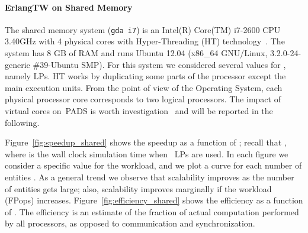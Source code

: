 \documentclass{sigplanconf}
\begin{document}
\begin{figure*}[ht]
\centering {}
\caption{Speedup on the shared memory architecture as a function of
  the number of~\acp{LP} (higher is better)}\label{fig:speedup_shared}
\end{figure*}

\begin{figure*}[ht]
\centering {}
\caption{Efficiency on the shared memory architecture as a function of
  the number of~\acp{LP} (higher is better)}\label{fig:efficiency_shared}
\end{figure*}

\begin{figure*}[h!t]
\centering {}
\caption{Total number of rollbacks on the shared memory architecture
  as a function of the number of LPs (lower is
  better)}\label{fig:rollbacks_shared}
\end{figure*}

\paragraph{ErlangTW on Shared Memory}
The shared memory system (\verb+gda i7+) is an Intel(R) Core(TM)
i7-2600 CPU \@ 3.40GHz with 4 physical cores with Hyper-Threading (HT)
technology~\cite{HT}. The system has 8 GB of RAM and runs Ubuntu 12.04
(x86\_64 GNU/Linux, 3.2.0-24-generic \#39-Ubuntu SMP). For this system
we considered several values for , namely 
\acp{LP}. HT works by duplicating some parts of the processor except
the main execution units. From the point of view of the Operating
System, each physical processor core corresponds to two logical
processors. The impact of virtual cores on~\ac{PADS} is worth
investigation~\cite{gda-dsrt-2006,gda12} and will be reported in the
following.

Figure~\ref{fig:speedup_shared} shows the speedup  as a function
of ; recall that , where  is the wall clock
simulation time when ~\acp{LP} are used.  In each figure we
consider a specific value for the workload, and we plot a curve for
each number of entities . As a general trend we observe that
scalability improves as the number of entities gets large; also,
scalability improves marginally if the workload (FPops) increases.
Figure~\ref{fig:efficiency_shared} shows the efficiency
 as a function of . The efficiency is an
estimate of the fraction of actual computation performed by all
processors, as opposed to communication and synchronization.
\end{document}
